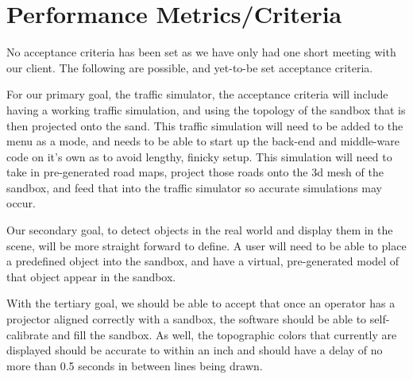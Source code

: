 \documentclass[10pt,draftclsnofoot,onecolumn]{IEEEtran}
\begin{document}
\section{Performance Metrics/Criteria}
\begin{flushleft}
    \qquad No acceptance criteria has been set as we have only had one short meeting with our client. The following are possible, and yet-to-be set acceptance criteria. 
\end{flushleft}
\begin{flushleft}
    \qquad For our primary goal, the traffic simulator, the acceptance criteria will include having a  working traffic simulation, and using the topology of the sandbox that is then projected onto the sand. This traffic simulation will need to be added to the menu as a mode, and needs to be able to start up the back-end and middle-ware code on it's own as to avoid lengthy, finicky setup. This simulation will need to take in pre-generated road maps, project those roads onto the 3d mesh of the sandbox, and feed that into the traffic simulator so accurate simulations may occur. 
\end{flushleft}

\begin{flushleft}
    \qquad Our secondary goal, to detect objects in the real world and display them in the scene, will be more straight forward to define. A user will need to be able to place a predefined object into the sandbox, and have a virtual, pre-generated model of that object appear in the sandbox.
\end{flushleft}

\begin{flushleft}
    \qquad  With the tertiary goal, we should be able to accept that once an operator has a projector aligned correctly with a sandbox, the software should be able to self-calibrate and fill the sandbox. As well, the topographic colors that currently are displayed should be accurate to within an inch and should have a delay of no more than 0.5 seconds in between lines being drawn.
\end{flushleft}
\end{document}
